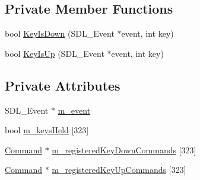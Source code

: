 \subsection*{Private Member Functions}
\begin{DoxyCompactItemize}
\item 
bool \hyperlink{classn8_1_1_input_service_a3f04f6225455752a020818c9267442cc}{Key\-Is\-Down} (S\-D\-L\-\_\-\-Event $\ast$event, int key)
\item 
bool \hyperlink{classn8_1_1_input_service_a8f872d72b45d21e42cd6e7ef1b7c202a}{Key\-Is\-Up} (S\-D\-L\-\_\-\-Event $\ast$event, int key)
\end{DoxyCompactItemize}
\subsection*{Private Attributes}
\begin{DoxyCompactItemize}
\item 
S\-D\-L\-\_\-\-Event $\ast$ \hyperlink{classn8_1_1_input_service_a9eab1e8bff2306d4e581175d0d683184}{m\-\_\-event}
\item 
bool \hyperlink{classn8_1_1_input_service_ac35485b7fde20abe519f9deebc813eb2}{m\-\_\-keys\-Held} \mbox{[}323\mbox{]}
\item 
\hyperlink{classn8_1_1_command}{Command} $\ast$ \hyperlink{classn8_1_1_input_service_a7ac30fbb458b6b41138a1a9ae76e3497}{m\-\_\-registered\-Key\-Down\-Commands} \mbox{[}323\mbox{]}
\item 
\hyperlink{classn8_1_1_command}{Command} $\ast$ \hyperlink{classn8_1_1_input_service_a3f222cabde1339a524d0a9ca70bc1d3f}{m\-\_\-registered\-Key\-Up\-Commands} \mbox{[}323\mbox{]}
\end{DoxyCompactItemize}


